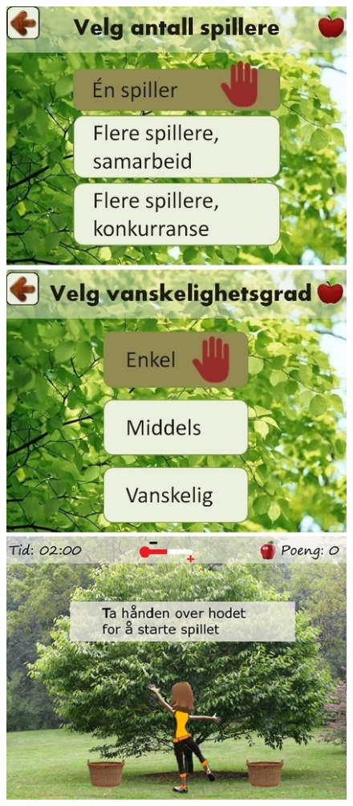 \begin{figure} [H]
\centering
\includegraphics[scale=0.45]{menuStep2.jpg}
\label{app:menu2Norsk}
\end{figure}


